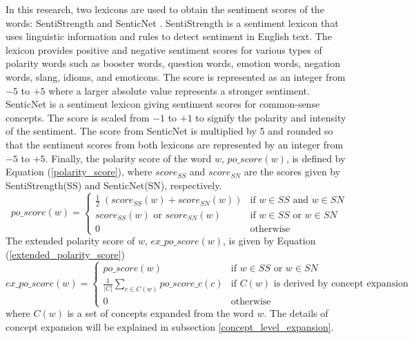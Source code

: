 \documentclass[english]{jnlp_1.4}
\begin{document}
In this research, two lexicons are used to obtain the sentiment scores of the words: SentiStrength \cite{Thelwall_2012} and SenticNet \cite{Cambria_2012}.
SentiStrength is a sentiment lexicon that uses linguistic information and rules to detect sentiment in English text.
The lexicon provides positive and negative sentiment scores for various types of polarity words such as booster words, question words, emotion words, negation words, slang, idioms, and emoticons.
The score is represented as an integer from $-5$ to $+5$ where a larger absolute value represents a stronger sentiment.
SenticNet is a sentiment lexicon giving sentiment scores for common-sense concepts.
The score is scaled from $-1$ to $+1$ to signify the polarity and intensity of the sentiment.
The score from SenticNet is multiplied by 5 and rounded so that the sentiment scores from both lexicons are represented by an integer from $-5$ to $+5$.
Finally, the polarity score of the word $w$, $po\_score(w)$, is defined by Equation (\ref{polarity_score}), where $score_\mathit{SS}$ and $score_\mathit{SN}$ are the scores given by SentiStrength(SS) and SenticNet(SN), respectively.
\begin{equation}
    \label{polarity_score}
    po\_score(w) = 
    \begin{cases}
      \frac{1}{2}\;(score_\mathit{SS}(w) + score_\mathit{SN}(w)) & \text{if } w \in SS \text{ and } w \in SN \\
      score_\mathit{SS}(w) \text{ or } score_\mathit{SN}(w) & \text{if } w \in SS \text{ or } w \in SN \\
      0 & \text{otherwise}
    \end{cases}
\end{equation}
The extended polarity score of $w$, $ex\_po\_score(w)$, is given by Equation (\ref{extended_polarity_score})
\begin{equation}
    \label{extended_polarity_score}
    ex\_po\_score(w) =
    \begin{cases}
      po\_score(w) & \text{if } w \in SS \text{ or } w \in SN \\
      \frac{1}{|C|}\sum\limits_{c \in C(w)} po\_score\_c(c) & \text{if } C(w) \text{ is derived by concept expansion} \\
      0 & \text{otherwise}
    \end{cases}
\end{equation}
where $C(w)$ is a set of concepts expanded from the word $w$.
The details of concept expansion will be explained in subsection \ref{concept_level_expansion}.
\end{document}
